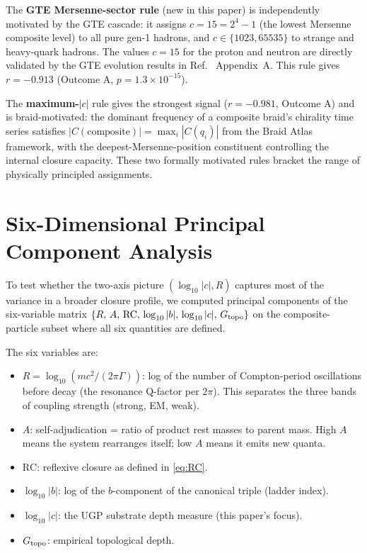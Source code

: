 \documentclass[12pt,a4paper]{article}
\newcommand{\RC}{\ensuremath{\mathrm{RC}}}
\begin{document}
The \textbf{GTE Mersenne-sector rule} (new in this paper) is independently
motivated by the GTE cascade: it assigns
$c = 15 = 2^4-1$ (the lowest Mersenne composite level) to all
pure gen-1 hadrons, and $c \in \{1023, 65535\}$ to strange and heavy-quark
hadrons.
The values $c = 15$ for the proton and neutron are directly validated
by the GTE evolution results in Ref.~\cite{Spivack2026_SM_UGP} Appendix~A.
This rule gives $r = -0.913$ (Outcome A, $p = 1.3\times10^{-15}$).

The \textbf{maximum-$|c|$} rule gives the strongest signal ($r = -0.981$,
Outcome A) and is braid-motivated: the dominant frequency of a composite
braid's chirality time series satisfies
$|C(\text{composite})| = \max_i |C(q_i)|$ from the Braid Atlas~\cite{SpivackBraidAtlas}
framework, with the deepest-Mersenne-position constituent controlling
the internal closure capacity.
These two formally motivated rules bracket the range of physically
principled assignments.

\section{Six-Dimensional Principal Component Analysis}
\label{sec:pca}

To test whether the two-axis picture
$({\log_{10}|c|}, R)$ captures most of the variance in a broader closure
profile, we computed principal components of the six-variable matrix
$\{R,\, A,\, \RC,\, \log_{10}|b|,\, \log_{10}|c|,\, G_{\rm topo}\}$
on the composite-particle subset where all six quantities are defined.

The six variables are:
\begin{itemize}[leftmargin=2em]
  \item $R = \log_{10}(mc^2/(2\pi\Gamma))$: log of the number of Compton-period
    oscillations before decay (the resonance Q-factor per $2\pi$).
    This separates the three bands of coupling strength (strong, EM, weak).
  \item $A$: self-adjudication = ratio of product rest masses to parent mass.
    High $A$ means the system rearranges itself; low $A$ means it emits new quanta.
  \item $\RC$: reflexive closure as defined in \cref{eq:RC}.
  \item $\log_{10}|b|$: log of the $b$-component of the canonical triple
    (ladder index).
  \item $\log_{10}|c|$: the UGP substrate depth measure (this paper's focus).
  \item $G_{\rm topo}$: empirical topological depth.
\end{itemize}
\end{document}
